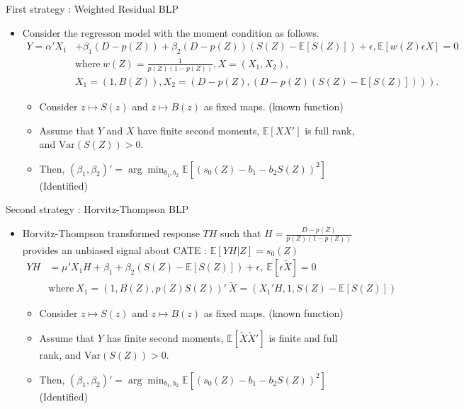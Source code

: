 \documentclass[xcolor=svgnames,aspectratio=169]{beamer}
\newcommand{\E}{\mathbb{E}}
\newcommand{\var}{\text{Var}}
\begin{document}
\begin{frame}{First strategy : Weighted Residual BLP}
    \begin{itemize}
        \item Consider the regresson model with the moment condition as follows.
        \begin{align*}
            Y=\alpha'X_1&+\beta_1(D-p(Z))+\beta_2(D-p(Z))(S(Z)-\E[S(Z)])+\epsilon, \E[w(Z)\epsilon X]=0 \\
            &\text{where} \  w(Z)=\frac{1}{p(Z)(1-p(Z))}, X=(X_1,X_2), \\ 
            &X_1=(1,B(Z)),X_2=(D-p(Z),(D-p(Z)(S(Z)-\E[S(Z)]))).
        \end{align*}
        \begin{tcolorbox}[colframe=Cyan,title=Theorem 1]
        \begin{itemize}
            \item Consider $z\mapsto S(z)$ and $z\mapsto B(z)$ as fixed maps. (known function)
            \item Assume that $Y$ and $X$ have finite second moments, $\E[XX']$ is full rank, and $\var(S(Z))>0$.
            \item Then, $(\beta_1, \beta_2)'=\arg\min_{b_1,b_2}\E[(s_0(Z)-b_1-b_2 S(Z))^2]$ (Identified)
        \end{itemize}
    \end{tcolorbox}
    \end{itemize}
\end{frame}

\begin{frame}{Second strategy : Horvitz-Thompson BLP}
    \begin{itemize}
        \item Horvitz-Thompson transformed response $TH$ such that $H=\frac{D-p(Z)}{p(Z)(1-p(Z))}$ provides an unbiased signal about CATE : $\E[YH|Z]=s_0(Z)$
        \begin{align*}
            YH&=\mu'X_1H+\beta_1+\beta_2(S(Z)-\E[S(Z)])+\epsilon, \ \E[\epsilon\tilde{X}]=0 \\
            &\text{where} \ X_1=(1,B(Z),p(Z)S(Z))' \  \tilde{X}=(X_1'H, 1, S(Z)-\E[S(Z)])
        \end{align*}
        \begin{tcolorbox}[colframe=Cyan,title=Theorem 2]
        \begin{itemize}
            \item Consider $z\mapsto S(z)$ and $z\mapsto B(z)$ as fixed maps. (known function)
            \item Assume that $Y$ has finite second moments, $\E[\tilde{X}\tilde{X}']$ is finite and full rank, and $\var(S(Z))>0$.
            \item Then, $(\beta_1, \beta_2)'=\arg\min_{b_1,b_2}\E[(s_0(Z)-b_1-b_2 S(Z))^2]$ (Identified)
        \end{itemize}
    \end{tcolorbox}
    \end{itemize}
\end{frame}
\end{document}
